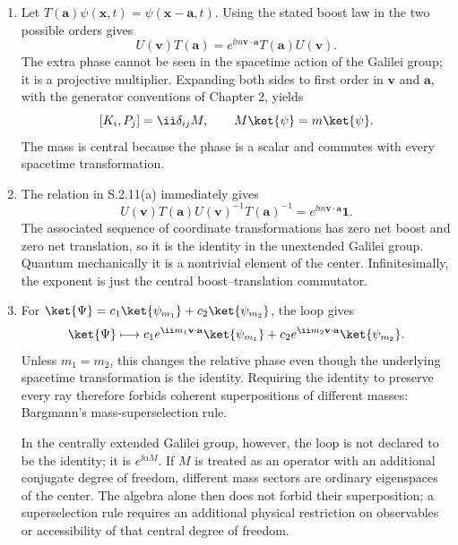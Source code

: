 \begin{enumerate}
\begin{enumerate}
\item
Let \(T(\mathbf a)\psi(\mathbf x,t)=\psi(\mathbf x-\mathbf a,t)\).
Using the stated boost law in the two possible orders gives
\[
 U(\mathbf v)T(\mathbf a)
 =e^{\ii m\mathbf v\cdot\mathbf a}
   T(\mathbf a)U(\mathbf v).
\]
The extra phase cannot be seen in the spacetime action of the Galilei
group; it is a projective multiplier.  Expanding both sides to first order
in \(\mathbf v\) and \(\mathbf a\), with the generator conventions of
Chapter 2, yields
\[
 [K_i,P_j]=\ii\delta_{ij}M,\qquad M\ket{\psi}=m\ket{\psi}.
\]
The mass is central because the phase is a scalar and commutes with every
spacetime transformation.
\item
The relation in S.2.11(a) immediately gives
\[
 U(\mathbf v)T(\mathbf a)U(\mathbf v)^{-1}T(\mathbf a)^{-1}
 =e^{\ii m\mathbf v\cdot\mathbf a}\mathbf{1}.
\]
The associated sequence of coordinate transformations has zero net boost
and zero net translation, so it is the identity in the unextended Galilei
group.  Quantum mechanically it is a nontrivial element of the center.
Infinitesimally, the exponent is just the central
boost--translation commutator.
\item
For
\(\ket{\Psi}=c_1\ket{\psi_{m_1}}+c_2\ket{\psi_{m_2}}\), the loop gives
\[
 \ket{\Psi}\longmapsto
 c_1e^{\ii m_1\mathbf v\cdot\mathbf a}\ket{\psi_{m_1}}
 +c_2e^{\ii m_2\mathbf v\cdot\mathbf a}\ket{\psi_{m_2}}.
\]
Unless \(m_1=m_2\), this changes the relative phase even though the
underlying spacetime transformation is the identity.  Requiring the
identity to preserve every ray therefore forbids coherent superpositions
of different masses: Bargmann's mass-superselection rule.

In the centrally extended Galilei group, however, the loop is not declared
to be the identity; it is \(e^{\ii\alpha M}\).  If \(M\) is treated as an
operator with an additional conjugate degree of freedom, different mass
sectors are ordinary eigenspaces of the center.  The algebra alone then
does not forbid their superposition; a superselection rule requires an
additional physical restriction on observables or accessibility of that
central degree of freedom.
\end{enumerate}


\end{enumerate}
